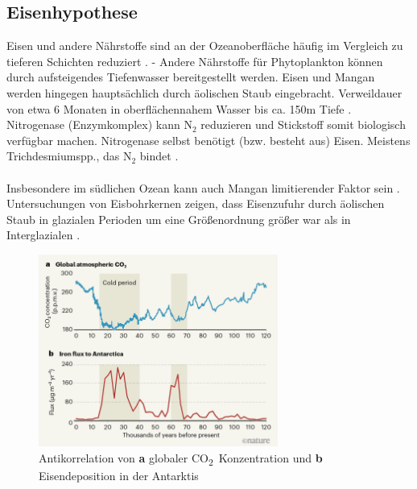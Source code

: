 \documentclass[12pt,a4paper,onecolumn]{scrartcl}
\newcommand{\cotwo}{CO\textsubscript{2}}
\begin{document}
\subsection{Eisenhypothese}
Eisen und andere Nährstoffe sind an der Ozeanoberfläche häufig im Vergleich zu tieferen Schichten reduziert \citep{Martin.1990}. - Andere Nährstoffe für Phytoplankton können durch aufsteigendes Tiefenwasser bereitgestellt werden. Eisen und Mangan werden hingegen hauptsächlich durch äolischen Staub eingebracht. Verweildauer von etwa 6 Monaten in oberflächennahem Wasser bis ca. 150m Tiefe \citep{Hayes.2015}. Nitrogenase (Enzymkomplex) kann N$_2$ reduzieren und Stickstoff somit biologisch verfügbar machen. Nitrogenase selbst benötigt (bzw. besteht aus) Eisen. Meistens Trichdesmiumspp., das N$_2$ bindet \citep{Falkowski.1998}.
\\\\ Insbesondere im südlichen Ozean kann auch Mangan limitierender Faktor sein \citep{Browning.2021}. Untersuchungen von Eisbohrkernen zeigen, dass Eisenzufuhr durch äolischen Staub in glazialen Perioden um eine Größenordnung größer war als in Interglazialen \citep{Falkowski.1998}.
\begin{figure}[ht]
\centering
\includegraphics[width=0.7\textwidth]{bilder/Stoll2020/antarctic-iron-global-co2.png}
\caption{Antikorrelation von \textbf{a} globaler \cotwo \ Konzentration und \textbf{b} Eisendeposition in der Antarktis \citep{Stoll.2020}}
\end{figure}
\end{document}
